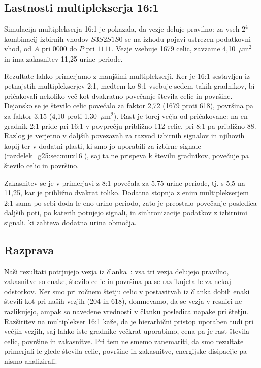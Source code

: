 \documentclass[graybox, envcountchap]{svmult}
\begin{document}
\subsection{Lastnosti multiplekserja 16:1}
\label{g25:sec:lastnosti16}

Simulacija multiplekserja 16:1 je pokazala, da vezje deluje pravilno: za vseh $2^{4}$ kombinacij izbirnih vhodov $S3S2S1S0$ se na izhodu pojavi ustrezen podatkovni vhod, od $A$ pri $0000$ do $P$ pri $1111$. Vezje vsebuje 1679 celic, zavzame 4,10~$\mu\mathrm{m}^2$ in ima zakasnitev 11,25 urine periode.

Rezultate lahko primerjamo z manjšimi multiplekserji. Ker je 16:1 sestavljen iz petnajstih multiplekserjev 2:1, medtem ko 8:1 vsebuje sedem takih gradnikov, bi pričakovali nekoliko več kot dvakratno povečanje števila celic in površine. Dejansko se je število celic povečalo za faktor 2,72 (1679 proti 618), površina pa za faktor 3,15 (4,10 proti 1,30~$\mu\mathrm{m}^2$). Rast je torej večja od pričakovane: na en gradnik 2:1 pride pri 16:1 v povprečju približno 112 celic, pri 8:1 pa približno 88. Razlog je verjetno v daljših povezavah za razvod izbirnih signalov in njihovih kopij ter v dodatni plasti, ki smo jo uporabili za izbirne signale (razdelek~\ref{g25:sec:mux16}), saj ta ne prispeva k številu gradnikov, povečuje pa število celic in površino.

Zakasnitev se je v primerjavi z 8:1 povečala za 5,75 urine periode, tj. s 5,5 na 11,25, kar je približno dvakrat toliko. Dodatna stopnja z enim multiplekserjem 2:1 sama po sebi doda le eno urino periodo, zato je preostalo povečanje posledica daljših poti, po katerih potujejo signali, in sinhronizacije podatkov z izbirnimi signali, ki zahteva dodatna urina območja.
\subsection{Razprava}
\label{g25:sec:razprava}

Naši rezultati potrjujejo vezja iz članka~\cite{alharbi2024}: vsa tri vezja delujejo pravilno, zakasnitve so enake, število celic in površina pa se razlikujeta le za nekaj odstotkov. Ker smo pri ročnem štetju celic v postavitvah iz članka dobili enaki števili kot pri naših vezjih (204 in 618), domnevamo, da se vezja v resnici ne razlikujejo, ampak so navedene vrednosti v članku posledica napake pri štetju. Razširitev na multiplekser 16:1 kaže, da je hierarhični pristop uporaben tudi pri večjih vezjih, saj lahko iste gradnike večkrat uporabimo, cena pa je rast števila celic, površine in zakasnitve. Pri tem ne smemo zanemariti, da smo rezultate primerjali le glede števila celic, površine in zakasnitve, energijske disipacije pa nismo analizirali.


\newpage

\end{document}
